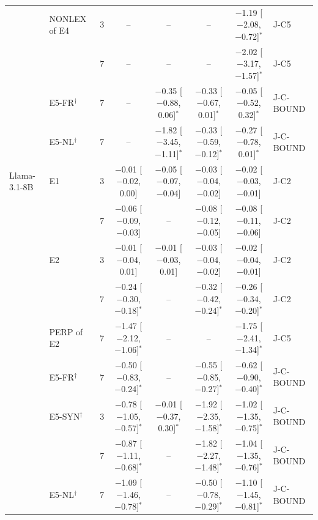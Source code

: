 \begin{tabular}{@{}lllcccc l@{}}
 & NONLEX of E4 & 3 & -- & -- & -- & $-$1.19 [$-$2.08, $-$0.72]$^{*}$ & J-C5 \\
 &  & 7 & -- & -- & -- & $-$2.02 [$-$3.17, $-$1.57]$^{*}$ & J-C5 \\
 & E5-FR$^\dagger$ & 7 & -- & $-$0.35 [$-$0.88, 0.06]$^{*}$ & $-$0.33 [$-$0.67, 0.01]$^{*}$ & $-$0.05 [$-$0.52, 0.32]$^{*}$ & J-C-BOUND \\
 & E5-NL$^\dagger$ & 7 & -- & $-$1.82 [$-$3.45, $-$1.11]$^{*}$ & $-$0.33 [$-$0.59, $-$0.12]$^{*}$ & $-$0.27 [$-$0.78, 0.01]$^{*}$ & J-C-BOUND \\
\midrule
Llama-3.1-8B & E1 & 3 & $-$0.01 [$-$0.02, 0.00] & $-$0.05 [$-$0.07, $-$0.04] & $-$0.03 [$-$0.04, $-$0.02] & $-$0.02 [$-$0.03, $-$0.01] & J-C2 \\
 &  & 7 & $-$0.06 [$-$0.09, $-$0.03] & -- & $-$0.08 [$-$0.12, $-$0.05] & $-$0.08 [$-$0.11, $-$0.06] & J-C2 \\
 & E2 & 3 & $-$0.01 [$-$0.04, 0.01] & $-$0.01 [$-$0.03, 0.01] & $-$0.03 [$-$0.04, $-$0.02] & $-$0.02 [$-$0.04, $-$0.01] & J-C2 \\
 &  & 7 & $-$0.24 [$-$0.30, $-$0.18]$^{*}$ & -- & $-$0.32 [$-$0.42, $-$0.24]$^{*}$ & $-$0.26 [$-$0.34, $-$0.20]$^{*}$ & J-C2 \\
 & PERP of E2 & 7 & $-$1.47 [$-$2.12, $-$1.06]$^{*}$ & -- & -- & $-$1.75 [$-$2.41, $-$1.34]$^{*}$ & J-C5 \\
 & E5-FR$^\dagger$ & 7 & $-$0.50 [$-$0.83, $-$0.24]$^{*}$ & -- & $-$0.55 [$-$0.85, $-$0.27]$^{*}$ & $-$0.62 [$-$0.90, $-$0.40]$^{*}$ & J-C-BOUND \\
 & E5-SYN$^\dagger$ & 3 & $-$0.78 [$-$1.05, $-$0.57]$^{*}$ & $-$0.01 [$-$0.37, 0.30]$^{*}$ & $-$1.92 [$-$2.35, $-$1.58]$^{*}$ & $-$1.02 [$-$1.35, $-$0.75]$^{*}$ & J-C-BOUND \\
 &  & 7 & $-$0.87 [$-$1.11, $-$0.68]$^{*}$ & -- & $-$1.82 [$-$2.27, $-$1.48]$^{*}$ & $-$1.04 [$-$1.35, $-$0.76]$^{*}$ & J-C-BOUND \\
 & E5-NL$^\dagger$ & 7 & $-$1.09 [$-$1.46, $-$0.78]$^{*}$ & -- & $-$0.50 [$-$0.78, $-$0.29]$^{*}$ & $-$1.10 [$-$1.45, $-$0.81]$^{*}$ & J-C-BOUND \\
\bottomrule
\end{tabular}
